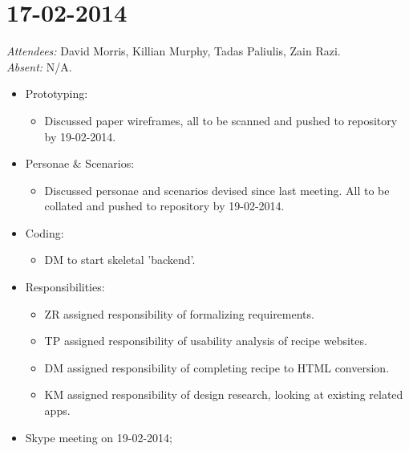 \documentclass{article}
\begin{document}
\clearpage

\section*{17-02-2014}
\vspace{0.5cm}
\emph{Attendees: }David Morris, Killian Murphy, Tadas Paliulis, Zain Razi.
\\
\emph{Absent: }N/A.

\begin{itemize}
\item Prototyping:
  \begin{itemize}
  \item Discussed paper wireframes, all to be scanned and pushed to repository by 19-02-2014.
  \end{itemize}
\item Personae \& Scenarios:
  \begin{itemize}
  \item Discussed personae and scenarios devised since last meeting. All to be collated and pushed to repository by 19-02-2014.
  \end{itemize}
\item Coding:
  \begin{itemize}
  \item DM to start skeletal 'backend'.
  \end{itemize}
\item Responsibilities:
  \begin{itemize}
  \item ZR assigned responsibility of formalizing requirements.
  \item TP assigned responsibility of usability analysis of recipe websites.
  \item DM assigned responsibility of completing recipe to HTML conversion.
  \item KM assigned responsibility of design research, looking at existing related apps.
  \end{itemize}
\item Skype meeting on 19-02-2014;
\end{itemize}
\end{document}
